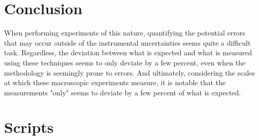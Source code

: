 \documentclass[11pt,a4paper]{article}
\begin{document}
\section{\label{sect:conclusion}Conclusion}
  When performing experiments of this nature, quantifying the potential errors that may occur outside of the instrumental uncertainties seems quite a difficult task. Regardless, the deviation between what is expected and what is measured using these techniques seems to only deviate by a few percent, even when the methodology is seemingly prone to errors. And ultimately, considering the scales at which these macroscopic experiments measure, it is notable that the measurements "only" seems to deviate by a few percent of what is expected.




\newpage
\appendix
\section{Scripts\label{app:scripts}}

\end{document}
